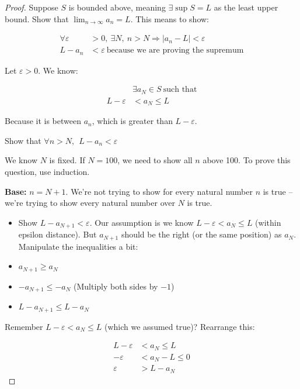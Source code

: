 \documentclass[12pt]{article}
\theoremstyle{plain}
\theoremstyle{remark}
\theoremstyle{definition}
\begin{document}
\begin{proof} Suppose \(S\) is bounded above, meaning
\(\exists\sup S = L\) as the least upper bound. Show that
\(\lim_{n \rightarrow \infty}a_{n} = L\). This means to show:

\begin{align*}
\forall\varepsilon &> 0,\ \exists N,\ n > N \Rightarrow \left| a_{n} - L \right| < \varepsilon \\
L - a_{n} &< \varepsilon\ \text{because\ we\ are\ proving\ the\ supremum}
\end{align*}


Let \(\varepsilon > 0\). We know:

\begin{align*}
&\exists a_{N} \in S\ \text{such\ that} \\
L - \varepsilon &< a_{N} \leq L
\end{align*}


Because it is between \(a_{n}\), which is greater than
\(L - \varepsilon\).

Show that \(\forall n > N,\ \ L - a_{n} < \varepsilon\)

We know \(N\) is fixed. If \(N = 100\), we need to show all \(n\) above
100. To prove this question, use induction.

\textbf{Base:} \(n = N + 1\). We're not trying to show for every natural
number \(n\) is true -- we're trying to show every natural number over
\(N\) is true.

\begin{itemize}
\item
  Show \(L - a_{N + 1} < \varepsilon\). Our assumption is we know
  \(L - \varepsilon < a_{N} \leq L\) (within epsilon distance). But
  \(a_{N + 1}\) should be the right (or the same position) as \(a_{N}\).
  Manipulate the inequalities a bit:
\item
  \(a_{N + 1} \geq a_{N}\)
\item
  \(- a_{N + 1} \leq - a_{N}\) (Multiply both sides by \(- 1\))
\item
  \(L - a_{N + 1} \leq L - a_{N}\)
\end{itemize}

Remember \(L - \varepsilon < a_{N} \leq L\) (which we assumed true)?
Rearrange this:

\begin{align*}
L - \varepsilon &< a_{N} \leq L \\
- \varepsilon &< a_{N} - L \leq 0 \\
\varepsilon &> L - a_{N}
\end{align*}



\end{proof}
\end{document}
